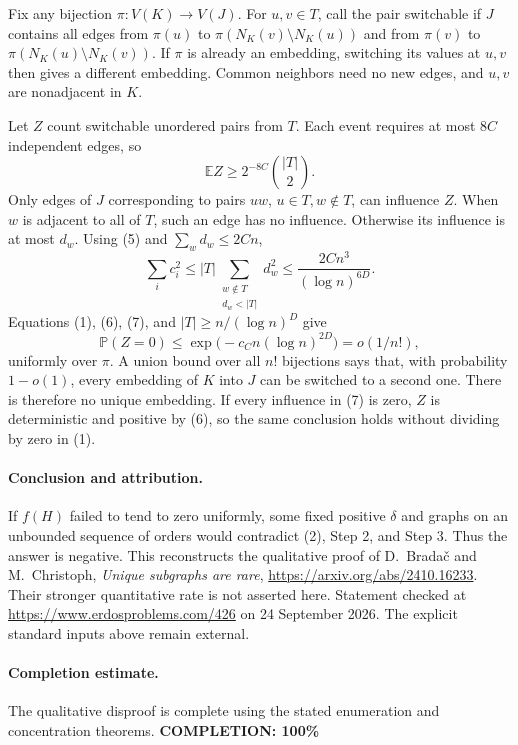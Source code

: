 Fix any bijection \(\pi:V(K)\to V(J)\). For \(u,v\in T\), call the
pair switchable if \(J\) contains all edges from \(\pi(u)\) to
\(\pi(N_K(v)\setminus N_K(u))\) and from \(\pi(v)\) to
\(\pi(N_K(u)\setminus N_K(v))\).
If \(\pi\) is already an embedding, switching its values at \(u,v\)
then gives a different embedding. Common neighbors need no new edges,
and \(u,v\) are nonadjacent in \(K\).

Let \(Z\) count switchable unordered pairs from \(T\).
Each event requires at most \(8C\) independent edges, so
\[
 \mathbb EZ\geq2^{-8C}\binom{|T|}{2}.
 \tag{6}
\]
Only edges of \(J\) corresponding to pairs \(uw\), \(u\in T,w\notin T\),
can influence \(Z\). When \(w\) is adjacent to all of \(T\), such an
edge has no influence. Otherwise its influence is at most \(d_w\).
Using (5) and \(\sum_wd_w\leq2Cn\),
\[
 \sum_i c_i^2
 \leq |T|\sum_{\substack{w\notin T\\d_w<|T|}}d_w^2
 \leq\frac{2Cn^3}{(\log n)^{6D}}.
 \tag{7}
\]
Equations (1), (6), (7), and \(|T|\geq n/(\log n)^D\) give
\[
 \mathbb P(Z=0)
 \leq\exp\bigl(-c_C n(\log n)^{2D}\bigr)
 =o(1/n!),
 \tag{8}
\]
uniformly over \(\pi\). A union bound over all \(n!\) bijections says
that, with probability \(1-o(1)\), every embedding of \(K\) into \(J\)
can be switched to a second one. There is therefore no unique embedding.
If every influence in (7) is zero, \(Z\) is deterministic and positive
by (6), so the same conclusion holds without dividing by zero in (1).

\paragraph{Conclusion and attribution.}
If \(f(H)\) failed to tend to zero uniformly, some fixed positive
\(\delta\) and graphs on an unbounded sequence of orders would
contradict (2), Step 2, and Step 3. Thus the answer is negative.
This reconstructs the qualitative proof of D.~Brada\v{c} and
M.~Christoph, \emph{Unique subgraphs are rare},
\url{https://arxiv.org/abs/2410.16233}.
Their stronger quantitative rate is not asserted here.
Statement checked at \url{https://www.erdosproblems.com/426}
on 24 September 2026. The explicit standard inputs above remain external.

\paragraph{Completion estimate.}
The qualitative disproof is complete using the stated enumeration and concentration theorems.
\textbf{COMPLETION: 100\%}
